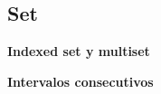 \subsection{Set}
    \textbf{Indexed set y multiset}
    

    \textbf{Intervalos consecutivos}
    